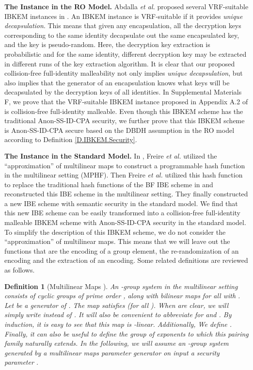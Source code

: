 \documentclass[10pt,twocolumn,twoside]{IEEEtran}
\newtheorem{definition}{Definition}
\begin{document}
{\textbf{The Instance in the RO Model.} Abdalla \emph{et al.} proposed several VRF-suitable IBKEM instances in \cite{ACF13}. An IBKEM instance is VRF-suitable if it provides \emph{unique decapsulation}. This means that given any encapsulation, all the decryption keys corresponding to the same identity decapsulate out the same encapsulated key, and the key is pseudo-random. Here, the decryption key extraction is probabilistic and for the same identity, different decryption key may be extracted in different runs of the key extraction algorithm. It is clear that our proposed collision-free full-identity malleability not only implies \emph{unique decapsulation}, but also implies that the generator of an encapsulation knows what keys will be decapsulated by the decryption keys of all identities. In Supplemental Materials  F, we prove that the VRF-suitable IBKEM instance proposed in Appendix A.2 of \cite{ACF13} is collision-free full-identity malleable. Even though this IBKEM scheme has the traditional Anon-SS-ID-CPA security, we further prove that this IBKEM scheme is Anon-SS-ID-CPA secure based on the DBDH assumption in the RO model according to Definition \ref{D.IBKEM.Security}. 

\textbf{The Instance in the Standard Model.}  In \cite{FHPS13}, Freire \emph{et al.} utilized the ``approximation'' of multilinear maps \cite{GGH13} to construct a programmable hash function in the multilinear setting (MPHF). Then Freire \emph{et al.} utilized this hash function to replace the traditional hash functions of the BF IBE scheme in \cite{BF01} and reconstructed this IBE scheme in the multilinear setting. They finally constructed a new IBE scheme with semantic security in the standard model. We find that this new IBE scheme can be easily transformed into a collision-free full-identity malleable IBKEM scheme with Anon-SS-ID-CPA security in the standard model. To simplify the description of this IBKEM scheme, we do not consider the ``approximation'' of multilinear maps. This means that we will leave out the functions that are the encoding of a group element,  the re-randomization of an encoding and the extraction of an encoding.  Some related definitions are reviewed as follows.

\begin{definition}[Multilinear Maps \cite{FHPS13}]\label{D.Multilinear} 
An -group system in the multilinear setting consists of  cyclic groups  of prime order , along with bilinear maps  for all  with . Let  be a generator of . The map  satisfies  (for all ). When  are clear, we will simply write  instead of . It will also be convenient to abbreviate  for  and . By induction, it is easy to see that this map is -linear. Additionally, We define . Finally, it can also be useful to define the group  of exponents to which this pairing family naturally extends. In the following, we will assume an -group system   generated by a \emph{multilinear maps parameter generator}  on input a security parameter .
\end{definition}

}
\end{document}
